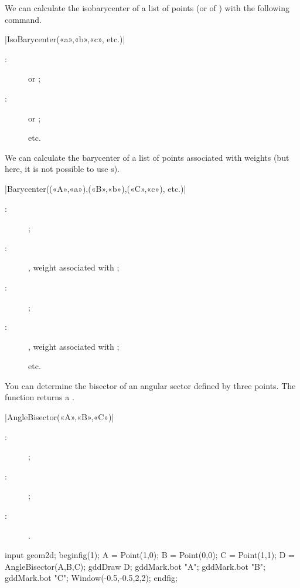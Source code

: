 \documentclass[a4paper,english]{article}
\begin{document}
We can calculate the isobarycenter of a list of points (or  of \MP) with the following command.
\begin{colourband}
\macro|IsoBarycenter(«a»,«b»,«c», etc.)|
\begin{description}
  \item[:]  or ;
  \item[:]  or ;
  \item[] etc.
\end{description}
\end{colourband}

We can calculate the barycenter of a list of points associated with weights (but
here, it is not possible to use \MP{} s).
\begin{colourband}
\macro|Barycenter((«A»,«a»),(«B»,«b»),(«C»,«c»), etc.)|
\begin{description}
  \item[:]  ;
  \item[:] , weight associated with  ;
  \item[:]  ;
  \item[:] , weight associated with  ;
  \item[] etc.
\end{description}
\end{colourband}


You can determine the bisector of an angular sector defined by three points. The function returns a .
\begin{colourband}
\macro|AngleBisector(«A»,«B»,«C»)|
\begin{description}
  \item[:]  ;
  \item[:]  ;
  \item[:] .
\end{description}
\end{colourband}

\begin{ExempleMP}
input geom2d;
beginfig(1);
A = Point(1,0);
B = Point(0,0);
C = Point(1,1);
D = AngleBisector(A,B,C);
gddDraw D;
gddMark.bot "A";
gddMark.bot "B";
gddMark.bot "C";
Window(-0.5,-0.5,2,2);
endfig;
\end{ExempleMP}
\end{document}
